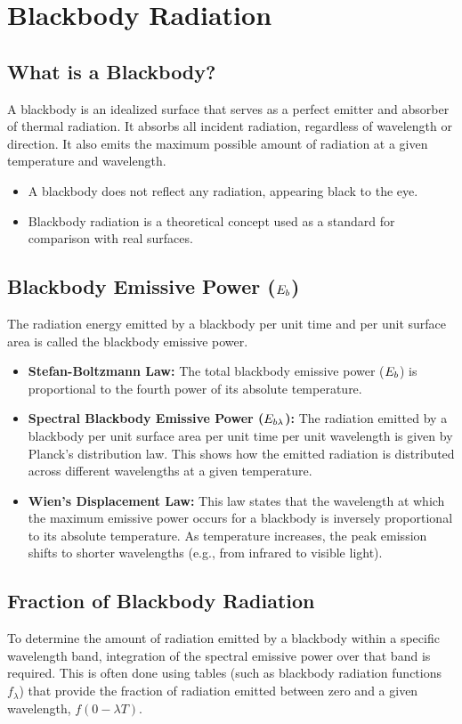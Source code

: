 \section{Blackbody Radiation}

\subsection{What is a Blackbody?}
A blackbody is an idealized surface that serves as a perfect emitter and absorber of thermal radiation. It absorbs all incident radiation, regardless of wavelength or direction. It also emits the maximum possible amount of radiation at a given temperature and wavelength.
\begin{itemize}
    \item A blackbody does not reflect any radiation, appearing black to the eye.
    \item Blackbody radiation is a theoretical concept used as a standard for comparison with real surfaces.
\end{itemize}

\subsection{Blackbody Emissive Power ($E_b$)}
The radiation energy emitted by a blackbody per unit time and per unit surface area is called the blackbody emissive power.
\begin{itemize}
    \item \textbf{Stefan-Boltzmann Law:} The total blackbody emissive power ($E_b$) is proportional to the fourth power of its absolute temperature.
    \item \textbf{Spectral Blackbody Emissive Power ($E_{b\lambda}$):} The radiation emitted by a blackbody per unit surface area per unit time per unit wavelength is given by Planck's distribution law. This shows how the emitted radiation is distributed across different wavelengths at a given temperature.
    \item \textbf{Wien's Displacement Law:} This law states that the wavelength at which the maximum emissive power occurs for a blackbody is inversely proportional to its absolute temperature. As temperature increases, the peak emission shifts to shorter wavelengths (e.g., from infrared to visible light).
\end{itemize}

\subsection{Fraction of Blackbody Radiation}
To determine the amount of radiation emitted by a blackbody within a specific wavelength band, integration of the spectral emissive power over that band is required. This is often done using tables (such as blackbody radiation functions $f_\lambda$) that provide the fraction of radiation emitted between zero and a given wavelength, $f(0-\lambda T)$.

